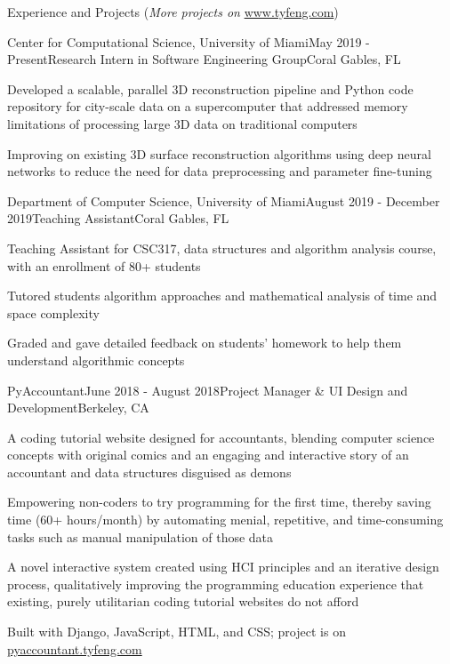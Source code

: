 \documentclass{resume} %
\begin{document}
\begin{rSection}{Experience and Projects} (\textit{More projects on} \url{www.tyfeng.com})



\begin{rSubsection}{Center for Computational Science, University of Miami}{May 2019 - Present}{Research Intern in Software Engineering Group}{Coral Gables, FL}  
\item Developed a scalable, parallel 3D reconstruction pipeline and Python code repository for city-scale data on a supercomputer that addressed memory limitations of processing large 3D data on traditional computers
\item Improving on existing 3D surface reconstruction algorithms using deep neural networks to reduce the need for data preprocessing and parameter fine-tuning
\end{rSubsection}

\begin{rSubsection}{Department of Computer Science, University of Miami}{August 2019 - December 2019}{Teaching Assistant}{Coral Gables, FL}
\item Teaching Assistant for CSC317, data structures and algorithm analysis course, with an enrollment of 80+ students
\item Tutored students algorithm approaches and mathematical analysis of time and space complexity 
\item Graded and gave detailed feedback on students' homework to help them understand algorithmic concepts
\end{rSubsection}

\begin{rSubsection}{PyAccountant}{June 2018 - August 2018}{Project Manager \& UI Design and Development}{Berkeley, CA}
\item A coding tutorial website designed for accountants, blending computer science concepts with original comics and an engaging and interactive story of an accountant and data structures disguised as demons
\item Empowering non-coders to try programming for the first time, thereby saving time (60+ hours/month) by automating menial, repetitive, and time-consuming tasks such as manual manipulation of those data
\item A novel interactive system created using HCI principles and an iterative design process, qualitatively improving the programming education experience that existing, purely utilitarian coding tutorial websites do not afford
\item Built with Django, JavaScript, HTML, and CSS; project is on \url{pyaccountant.tyfeng.com}
\end{rSubsection}


\end{rSection}
\end{document}
